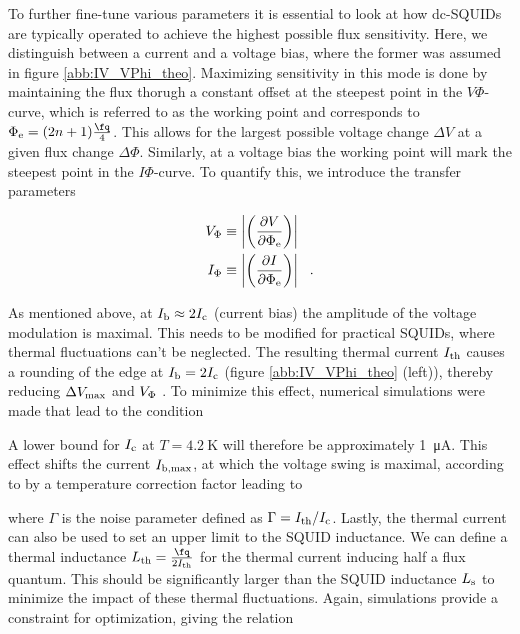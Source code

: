 To further fine-tune various parameters it is essential to look at how dc-SQUIDs are typically operated to achieve the highest possible flux sensitivity. Here, we distinguish between a current and a voltage bias, where the former was assumed in figure \ref{abb:IV_VPhi_theo}. Maximizing sensitivity in this mode is done by maintaining the flux thorugh a constant offset at the steepest point in the $V\Phi$-curve, which is referred to as the working point and corresponds to $\Phi_{\rm e}=(2n+1)\frac{\unit{\fq}}{4}$. This allows for the largest possible voltage change $\Delta V$ at a given flux change $\Delta \Phi$. Similarly, at a voltage bias the working point will mark the steepest point in the $I\Phi$-curve. To quantify this, we introduce the transfer parameters 

\begin{align}
V_{\rm \Phi} &\equiv \left| \left(\frac{\partial V}{\partial\Phi_{\rm e}}\right)\right| \\ I_{\rm \Phi} &\equiv \left| \left(\frac{\partial I}{\partial\Phi_{\rm e}}\right)\right| \ \ .
\end{align}

As mentioned above, at $I_{\rm b}\approx 2I_{\rm c}$ (current bias) the amplitude of the voltage modulation is maximal. This needs to be modified for practical SQUIDs, where thermal fluctuations can't be neglected. The resulting thermal current $I_{\rm th}$ causes a rounding of the edge at $I_{\rm b}= 2I_{\rm c}$ (figure \ref{abb:IV_VPhi_theo} (left)), thereby reducing $\Delta V_{\rm max}$ and $V_{\rm \Phi}$ \cite{Ivanchenko1968}. To minimize this effect, numerical simulations were made that lead to the condition \cite{Clarke1988}


A lower bound for $I_{\rm c}$ at $T=\qty{4.2}{\kelvin}$ will therefore be approximately \qty{1}{\uA}. This effect shifts the current $I_{\rm b,max}$, at which the voltage swing is maximal, according to \cite{Drung1996} by a temperature correction factor leading to 


where $\Gamma$ is the noise parameter defined as $\Gamma=I_{\rm th}/I_{\rm c}$. Lastly, the thermal current can also be used to set an upper limit to the SQUID inductance. We can define a thermal inductance $L_{\rm th}=\frac{\unit{\fq}}{2I_{\rm th}}$ for the thermal current inducing half a flux quantum. This should be significantly larger than the SQUID inductance $L_{\rm s}$ to minimize the impact of these thermal fluctuations. Again, simulations provide a constraint for optimization, giving the relation \cite{Clarke1988}

